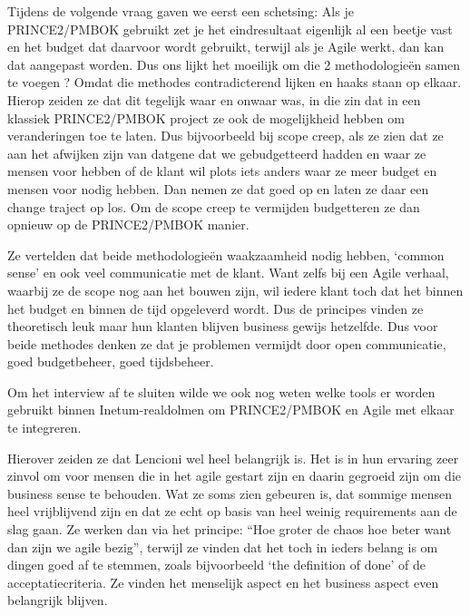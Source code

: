 \documentclass[dutch]{hogent-article}
\begin{document}
Tijdens de volgende vraag gaven we eerst een schetsing: Als je PRINCE2/PMBOK gebruikt zet je het eindresultaat eigenlijk al een beetje vast en het budget dat daarvoor wordt gebruikt, terwijl als je Agile werkt, dan kan dat aangepast worden. Dus ons lijkt het moeilijk om die 2 methodologieën samen te voegen ? Omdat die methodes contradicterend lijken en haaks staan op elkaar. Hierop zeiden ze dat dit tegelijk waar en onwaar was, in die zin dat in een klassiek PRINCE2/PMBOK project ze ook de mogelijkheid hebben om veranderingen toe te laten. Dus bijvoorbeeld bij scope creep, als ze zien dat ze aan het afwijken zijn van datgene dat we gebudgetteerd hadden en waar ze mensen voor hebben of de klant wil plots iets anders waar ze meer budget en mensen voor nodig hebben. Dan nemen ze dat goed op en  laten ze daar een change traject op los. Om de scope creep te vermijden budgetteren ze dan opnieuw op de PRINCE2/PMBOK manier. 
\newline

Ze vertelden dat beide methodologieën waakzaamheid nodig hebben, ‘common sense’ en ook veel communicatie met de klant. Want zelfs bij een Agile verhaal, waarbij ze de scope nog aan het bouwen zijn, wil iedere klant toch dat het binnen het budget en binnen de tijd opgeleverd wordt. Dus de principes vinden ze theoretisch leuk maar hun klanten blijven business gewijs hetzelfde. Dus voor beide methodes denken ze dat je problemen vermijdt door open communicatie, goed budgetbeheer, goed tijdsbeheer.
\newline

Om het interview af te sluiten wilde we ook nog weten welke tools er worden gebruikt binnen Inetum-realdolmen om PRINCE2/PMBOK en Agile met elkaar te integreren. 
\newline

Hierover zeiden ze dat Lencioni wel heel belangrijk is. Het is in hun ervaring zeer zinvol om voor mensen die in het agile gestart zijn en daarin gegroeid zijn om die business sense te behouden. Wat ze soms zien gebeuren is, dat sommige mensen heel vrijblijvend zijn en dat ze echt op basis van heel weinig requirements aan de slag gaan. Ze werken dan via het principe: “Hoe groter de chaos hoe beter want dan zijn we agile bezig”, terwijl ze vinden dat het toch in ieders belang is om dingen goed af te stemmen, zoals bijvoorbeeld ‘the definition of done’ of de acceptatiecriteria. Ze vinden het menselijk aspect en het business aspect even belangrijk blijven.
\end{document}
